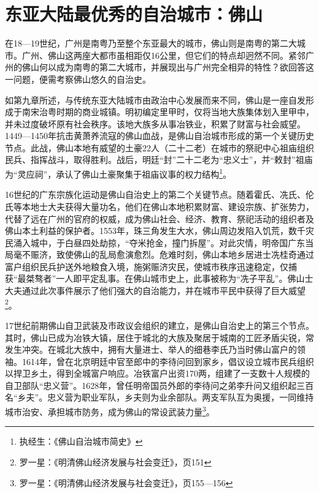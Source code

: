 \section{东亚大陆最优秀的自治城市：佛山}

在18—19世纪，广州是南粤乃至整个东亚最大的城市，佛山则是南粤的第二大城市。广州、佛山这两座大都市虽相距仅16公里，但它们的特点却迥然不同。紧邻广州的佛山何以成为南粤的第二大城市，并展现出与广州完全相异的特性？欲回答这一问题，便需考察佛山悠久的自治史。

如第九章所述，与传统东亚大陆城市由政治中心发展而来不同，佛山是一座自发形成于南宋治粤时期的商业城镇。明初编定里甲时，仅将当地大族集体划入里甲中，并未过度破坏原有社会秩序。该地大族多从事冶铁业，积累了财富与社会威望。1449—1450年抗击黄萧养流寇的佛山血战，是佛山自治城市形成的第一个关键历史节点。此战，佛山本地有威望的土豪22人（二十二老）在城市的祭祀中心祖庙组织民兵、指挥战斗，取得胜利。战后，明廷“封”二十二老为“忠义士”，并“敕封”祖庙为“灵应祠”，承认了佛山土豪聚集于祖庙议事的权力结构\footnote{执经生：《佛山自治城市简史》}。

16世纪的广东宗族化运动是佛山自治史上的第二个关键节点。随着霍氏、冼氏、伦氏等本地士大夫获得大量功名，他们在佛山本地积累财富、建设宗族、扩张势力，代替了远在广州的官府的权威，成为佛山社会、经济、教育、祭祀活动的组织者及佛山本土利益的保护者。1553年，珠三角发生大水，佛山周边发陷入饥荒，数千灾民涌入城中，于白昼四处劫掠，“夺米抢金，撞门拆屋”。对此灾情，明帝国广东当局毫不赈济，致使佛山的乱局愈演愈烈。危难时刻，佛山本地乡居进士冼桂奇通过富户组织民兵护送外地粮食入境，施粥赈济灾民，使城市秩序迅速稳定，仅捕获“最桀骜者”一人即平定乱事。在佛山城市史上，此事被称为“冼子平乱”。佛山士大夫通过此次事件展示了他们强大的自治能力，并在城市平民中获得了巨大威望\footnote{罗一星：《明清佛山经济发展与社会变迁》，页151}。

17世纪前期佛山自卫武装及市政议会组织的建立，是佛山自治史上的第三个节点。其时，佛山已成为冶铁大镇，居住于城北的大族及聚居于城南的工匠矛盾尖锐，常发生冲突。在城北大族中，拥有大量进士、举人的细巷李氏乃当时佛山富户的领袖。1614年，曾在北京明廷中官至郎中的李待问回到家乡，倡议设立城市民兵组织以捍卫乡土，得到全城富户响应。冶铁富户出资170两，组建了一支数十人规模的自卫部队“忠义营”。1628年，曾任明帝国员外郎的李待问之弟李升问又组织起三百名“乡夫”。忠义营为职业军队，乡夫则为业余部队。两支军队互为奥援，一同维持城市治安、承担城市防务，成为佛山的常设武装力量\footnote{罗一星：《明清佛山经济发展与社会变迁》，页155—156}。

